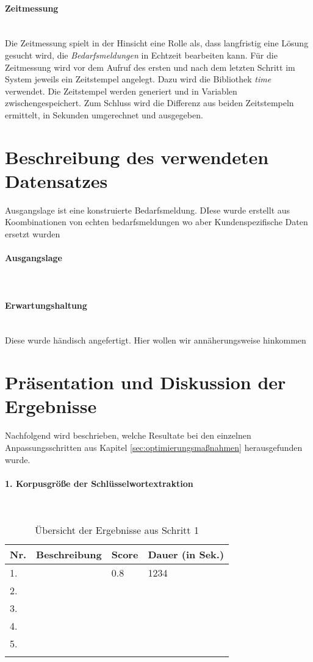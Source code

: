 \paragraph{Zeitmessung}\mbox{}\\
Die Zeitmessung spielt in der Hinsicht eine Rolle als, dass langfristig eine Lösung gesucht wird, die \emph{Bedarfsmeldungen} in Echtzeit bearbeiten kann. Für die Zeitmessung wird vor dem Aufruf des ersten und nach dem letzten Schritt im System jeweils ein Zeitstempel angelegt. Dazu wird die Bibliothek \emph{time} verwendet. Die Zeitstempel werden generiert und in Variablen zwischengespeichert. Zum Schluss wird die Differenz aus beiden Zeitstempeln ermittelt, in Sekunden umgerechnet und ausgegeben.\\
\section{Beschreibung des verwendeten Datensatzes}
Ausgangslage ist eine konstruierte Bedarfsmeldung. DIese wurde erstellt aus Koombinationen von echten bedarfsmeldungen wo aber Kundenspezifische Daten ersetzt wurden

\paragraph{Ausgangslage}\mbox{}\\
\paragraph{Erwartungshaltung}\mbox{}\\
Diese wurde händisch angefertigt. Hier wollen wir annäherungsweise hinkommen
\newpage

\section{Präsentation und Diskussion der Ergebnisse}
Nachfolgend wird beschrieben, welche Resultate bei den einzelnen Anpassungsschritten aus Kapitel \ref{sec:optimierungsmaßnahmen} herausgefunden wurde.
\paragraph{1. Korpusgröße der Schlüsselwortextraktion}\mbox{}\\
\begin{longtable}{| p{0.5cm} | p{8.5cm} | p{1.5cm} | p{3cm} |}
		\hline
		Nr. & Beschreibung & Score & Dauer (in Sek.)\\
		\hline
		\hline
		1. &  & 0.8 & 1234\\
		\hline
		2. &  &  &  \\
		\hline
		3. &  &  &  \\
		\hline
		4. &  &  &  \\
		\hline
		5. &  &  &  \\
		\hline
		\caption{Übersicht der Ergebnisse aus Schritt 1}
		\label{tab:korpus}
\end{longtable}

